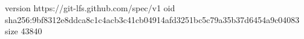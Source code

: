version https://git-lfs.github.com/spec/v1
oid sha256:9bf8312e8ddca8c1c4acb3c41cb04914afd3251bc5c79a35b37d6454a9c04083
size 43840
